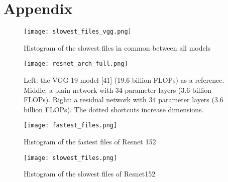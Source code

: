 
\chapter{Appendix}

\begin{figure}[ht]
       \centering 
	    \texttt{[image: slowest\_files\_vgg.png]}
        \caption{Histogram of the slowest files in common between all models}
         \label{fig:slowest_files_all}
\end{figure}

\begin{figure}[ht]
       \centering 
	    \texttt{[image: resnet\_arch\_full.png]}
        \caption[Example of the architecture of residual networks]{ Left: the VGG-19 model [41] (19.6 billion FLOPs) as a reference. Middle: a plain network with 34 parameter layers (3.6 billion FLOPs). Right: a residual network with 34 parameter layers (3.6 billion FLOPs). The dotted shortcuts increase dimensions.\cite{DBLP:journals/corr/HeZRS15}}
         \label{fig:resnet_arch_full}
\end{figure}
\begin{figure}[ht]
       \centering 
	    \texttt{[image: fastest\_files.png]}
        \caption{Histogram of the fastest files of Resnet 152}
         \label{fig:fastest_files_his}
\end{figure}

\begin{figure}[ht]
       \centering 
	    \texttt{[image: slowest\_files.png]}
        \caption{Histogram of the slowest files of Resnet152}
         \label{fig:slowest_files_his}
\end{figure}



